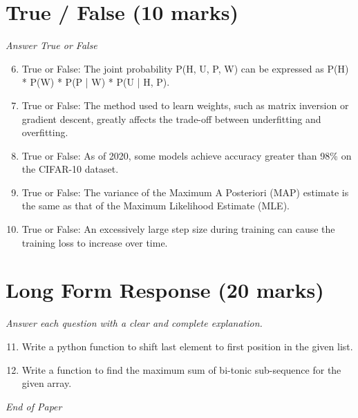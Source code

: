 \documentclass[12pt]{article}
\begin{document}
\section*{True / False (10 marks)}
\textit{Answer True or False}
\begin{enumerate}[label=\arabic*.]
\setcounter{enumi}{5}
\item True or False: The joint probability P(H, U, P, W) can be expressed as P(H) * P(W) * P(P | W) * P(U | H, P).
\item True or False: The method used to learn weights, such as matrix inversion or gradient descent, greatly affects the trade-off between underfitting and overfitting.
\item True or False: As of 2020, some models achieve accuracy greater than 98\% on the CIFAR-10 dataset.
\item True or False: The variance of the Maximum A Posteriori (MAP) estimate is the same as that of the Maximum Likelihood Estimate (MLE).
\item True or False: An excessively large step size during training can cause the training loss to increase over time.
\end{enumerate}

\section*{Long Form Response (20 marks)}
\textit{Answer each question with a clear and complete explanation.}
\begin{enumerate}[label=\arabic*.]
\setcounter{enumi}{10}
\item Write a python function to shift last element to first position in the given list.
\item Write a function to find the maximum sum of bi-tonic sub-sequence for the given array.
\end{enumerate}

\vfill
\noindent\textit{End of Paper}
\end{document}
